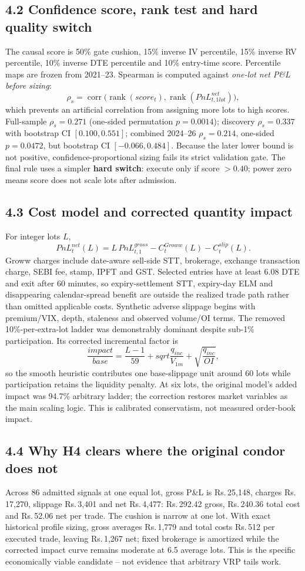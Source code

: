 \documentclass[10pt,a4paper]{article}
\newcommand{\INR}{\textsf{Rs.}\,}
\begin{document}
\subsection*{4.2 Confidence score, rank test and hard quality switch}
The causal score is 50\% gate cushion, 15\% inverse IV percentile, 15\% inverse RV percentile, 10\% inverse DTE percentile and 10\% entry-time score. Percentile maps are frozen from 2021--23. Spearman is computed against \emph{one-lot net P\&L before sizing}:
\[
\rho_s=\operatorname{corr}\big(\operatorname{rank}(score_t),\operatorname{rank}(PnL^{net}_{t,1lot})\big),
\]
which prevents an artificial correlation from assigning more lots to high scores. Full-sample $\rho_s=0.271$ (one-sided permutation $p=0.0014$); discovery $\rho_s=0.337$ with bootstrap CI $[0.100,0.551]$; combined 2024--26 $\rho_s=0.214$, one-sided $p=0.0472$, but bootstrap CI $[-0.066,0.484]$. Because the later lower bound is not positive, confidence-proportional sizing fails its strict validation gate. The final rule uses a simpler \textbf{hard switch}: execute only if score $>0.40$; power zero means score does not scale lots after admission.

\subsection*{4.3 Cost model and corrected quantity impact}
For integer lots $L$,
\[
PnL^{net}_t(L)=L\,PnL^{gross}_{t,1}-C^{Groww}_t(L)-C^{slip}_t(L).
\]
Groww charges include date-aware sell-side STT, brokerage, exchange transaction charge, SEBI fee, stamp, IPFT and GST. Selected entries have at least 6.08 DTE and exit after 60 minutes, so expiry-settlement STT, expiry-day ELM and disappearing calendar-spread benefit are outside the realized trade path rather than omitted applicable costs. Synthetic adverse slippage begins with premium/VIX, depth, staleness and observed volume/OI terms. The removed 10\%-per-extra-lot ladder was demonstrably dominant despite sub-1\% participation. Its corrected incremental factor is
\[
\frac{impact}{base}=\frac{L-1}{59}+sqrt{\frac{q_{inc}}{V_{1m}}}+\sqrt{\frac{q_{inc}}{OI}},
\]
so the smooth heuristic contributes one base-slippage unit around 60 lots while participation retains the liquidity penalty. At six lots, the original model's added impact was 94.7\% arbitrary ladder; the correction restores market variables as the main scaling logic. This is calibrated conservatism, not measured order-book impact.

\subsection*{4.4 Why H4 clears where the original condor does not}
Across 86 admitted signals at one equal lot, gross P\&L is \INR25,148, charges \INR17,270, slippage \INR3,401 and net \INR4,477: \INR292.42 gross, \INR240.36 total cost and \INR52.06 net per trade. The cushion is narrow at one lot. With exact historical profile sizing, gross averages \INR1,779 and total costs \INR512 per executed trade, leaving \INR1,267 net; fixed brokerage is amortized while the corrected impact curve remains moderate at 6.5 average lots. This is the specific economically viable candidate -- not evidence that arbitrary VRP tails work.
\end{document}
